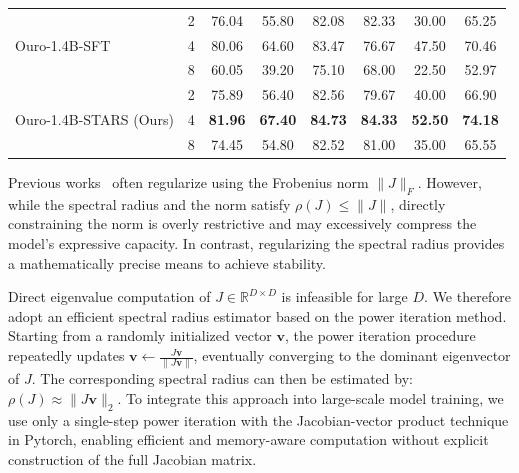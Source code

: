 \begin{table}[t]
{\begin{tabular}{l c c c c c c c}
        \multirow{3}{*}{Ouro-1.4B-SFT} 
            &  2  & 76.04 & 55.80 & 82.08 & 82.33 & 30.00& 65.25\\
            &  4  & 80.06 & 64.60 & 83.47 & 76.67 & 47.50&  70.46\\
            &  8  & 60.05 & 39.20 & 75.10 & 68.00 & 22.50& 52.97\\
        \midrule
        

\multirow{3}{*}{Ouro-1.4B-STARS (Ours)}  
            &  2  & 75.89 & 56.40 & 82.56 & 79.67 & 40.00& 66.90\\
     &  4  & \textbf{81.96} & \textbf{67.40} & \textbf{84.73} & \textbf{84.33} & \textbf{52.50}& \textbf{74.18}\\
            &  8  & 74.45 & 54.80 & 82.52 & 81.00 & 35.00& 65.55\\
        \bottomrule
    \end{tabular}}
\end{table}

Previous works~\citep{bai2019deep,bai2021stabilizing}  often regularize using the Frobenius norm \(\|J\|_F\). However, while the spectral radius and the norm satisfy \(\rho(J) \le \|J\|\), directly constraining the norm is overly restrictive and may excessively compress the model's expressive capacity. In contrast, regularizing the spectral radius provides a mathematically precise means to achieve stability.

Direct eigenvalue computation of \(J \in \mathbb{R}^{D \times D}\) is infeasible for large \(D\). We therefore adopt an efficient spectral radius estimator based on the power iteration method. Starting from a randomly initialized vector \(\mathbf{v}\), the power iteration procedure repeatedly updates \(\mathbf{v} \leftarrow \frac{J\mathbf{v}}{\|J\mathbf{v}\|}\), eventually converging to the dominant eigenvector of \(J\). The corresponding spectral radius can then be estimated by: \(\rho(J) \approx \|J\mathbf{v}\|_2\).
To integrate this approach into large-scale model training, we use only  a single-step power iteration with the Jacobian-vector product technique in Pytorch, enabling efficient and memory-aware computation without explicit construction of the full Jacobian matrix.



